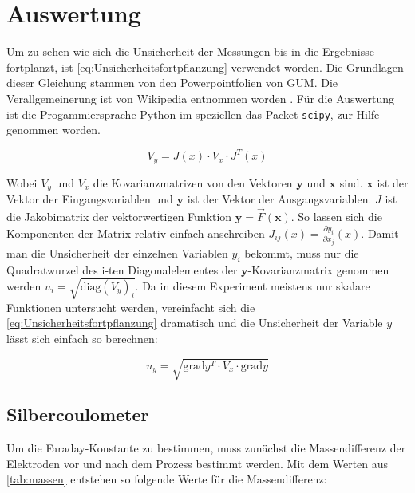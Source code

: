 \documentclass[11pt,ngerman]{scrartcl}
\begin{document}
\section{Auswertung}

\noindent Um zu sehen wie sich die Unsicherheit der Messungen bis in die Ergebnisse
fortplanzt, ist \autoref{eq:Unsicherheitsfortpflanzung} verwendet worden.
Die Grundlagen dieser Gleichung stammen von den Powerpointfolien von
GUM.\cite{WolfgangKessel2004} Die Verallgemeinerung ist von Wikipedia entnommen
worden \cite{2020Fehler}.
Für die Auswertung ist die Progammiersprache Python im speziellen das
Packet \verb#scipy#, zur Hilfe genommen worden.

\begin{equation}
	\label{eq:Unsicherheitsfortpflanzung}
	V_y = J(x) \cdot V_x \cdot J^{T}(x)
\end{equation}

\noindent Wobei $V_y$ und $V_x$ die Kovarianzmatrizen von den Vektoren $\bm{y}$ und $\bm{x}$ sind.
$\bm{x}$ ist der Vektor der Eingangsvariablen und $\bm{y}$ ist der Vektor der Ausgangsvariablen.
$J$ ist die Jakobimatrix der vektorwertigen Funktion $\bm{y} = \vec{F}(\bm{x})$.
So lassen sich die Komponenten der Matrix relativ einfach anschreiben $J_{ij}(x) = \frac{\partial{y_i}}{\partial{x_j}}(x)$.
Damit man die Unsicherheit der einzelnen Variablen $y_i$ bekommt, muss nur die Quadratwurzel des i-ten Diagonalelementes der
$\bm{y}$-Kovarianzmatrix genommen werden $u_i= \sqrt{\mathrm{diag}(V_y)_i}$.
Da in diesem Experiment meistens nur skalare Funktionen untersucht werden, vereinfacht
sich die \autoref{eq:Unsicherheitsfortpflanzung} dramatisch und die Unsicherheit
der Variable $y$ lässt sich einfach so berechnen:

\begin{equation}
	\label{eq:graduncentainty}
	u_y = \sqrt{\mathrm{grad} y^T \cdot V_x \cdot \mathrm{grad} y}
\end{equation}



\subsection{Silbercoulometer}

Um die Faraday-Konstante zu bestimmen, muss zunächst die Massendifferenz der
Elektroden vor und nach dem Prozess bestimmt werden. Mit dem Werten aus
\autoref{tab:massen} entstehen so folgende Werte für die Massendifferenz:
\end{document}
